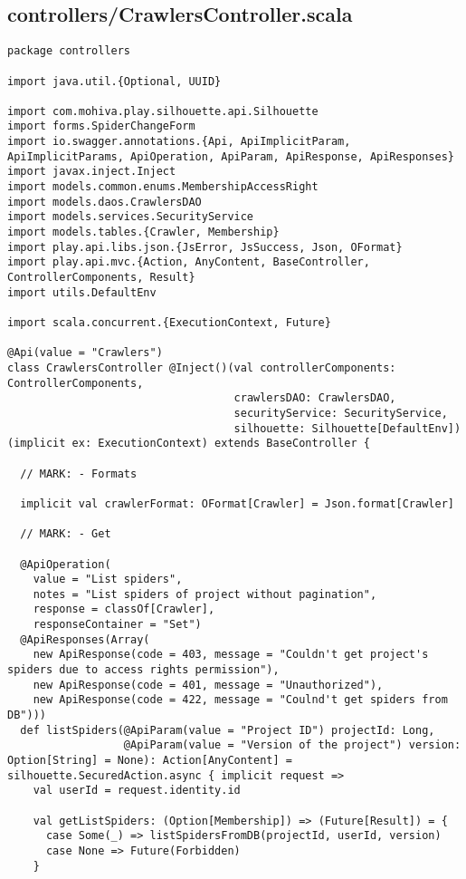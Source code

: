 \subsection{controllers/CrawlersController.scala}
\begin{lstlisting}
package controllers

import java.util.{Optional, UUID}

import com.mohiva.play.silhouette.api.Silhouette
import forms.SpiderChangeForm
import io.swagger.annotations.{Api, ApiImplicitParam, ApiImplicitParams, ApiOperation, ApiParam, ApiResponse, ApiResponses}
import javax.inject.Inject
import models.common.enums.MembershipAccessRight
import models.daos.CrawlersDAO
import models.services.SecurityService
import models.tables.{Crawler, Membership}
import play.api.libs.json.{JsError, JsSuccess, Json, OFormat}
import play.api.mvc.{Action, AnyContent, BaseController, ControllerComponents, Result}
import utils.DefaultEnv

import scala.concurrent.{ExecutionContext, Future}

@Api(value = "Crawlers")
class CrawlersController @Inject()(val controllerComponents: ControllerComponents,
                                   crawlersDAO: CrawlersDAO,
                                   securityService: SecurityService,
                                   silhouette: Silhouette[DefaultEnv])(implicit ex: ExecutionContext) extends BaseController {

  // MARK: - Formats

  implicit val crawlerFormat: OFormat[Crawler] = Json.format[Crawler]

  // MARK: - Get

  @ApiOperation(
    value = "List spiders",
    notes = "List spiders of project without pagination",
    response = classOf[Crawler],
    responseContainer = "Set")
  @ApiResponses(Array(
    new ApiResponse(code = 403, message = "Couldn't get project's spiders due to access rights permission"),
    new ApiResponse(code = 401, message = "Unauthorized"),
    new ApiResponse(code = 422, message = "Coulnd't get spiders from DB")))
  def listSpiders(@ApiParam(value = "Project ID") projectId: Long,
                  @ApiParam(value = "Version of the project") version: Option[String] = None): Action[AnyContent] = silhouette.SecuredAction.async { implicit request =>
    val userId = request.identity.id

    val getListSpiders: (Option[Membership]) => (Future[Result]) = {
      case Some(_) => listSpidersFromDB(projectId, userId, version)
      case None => Future(Forbidden)
    }


\end{lstlisting}
